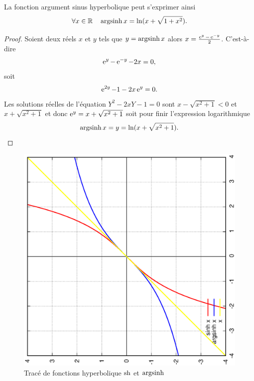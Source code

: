 %
\begin{prop}
La fonction argument sinus hyperbolique peut s'exprimer ainsi
 \begin{equation} 
   \forall x \in \mathbb{R} \quad \operatorname{argsinh} x = \ln(x+\sqrt{1+x^2}).
 \end{equation} 
\end{prop}
\begin{proof} 
  Soient deux réels $x$ et $y$ tels que $y=\operatorname{argsinh} x$ alors $x=\frac{\operatorname{e}^y - \operatorname{e}^{-y}}{2}$. C'est-à-dire 
  \begin{equation}
    \operatorname{e}^y - \operatorname{e}^{-y} -2x=0,
  \end{equation} 
  soit 
  \begin{equation}
    \operatorname{e}^{2y}-1-2x\operatorname{e}^{y}=0.
  \end{equation} 
  Les solutions réelles de l'équation $Y^2-2xY-1=0$ sont $x-\sqrt{x^2+1}<0$ et $x+\sqrt{x^2+1}$ et donc $\operatorname{e}^y=x+\sqrt{x^2+1}$ soit pour finir l'expression logarithmique 
  \begin{equation} 
    \operatorname{argsinh} x = y = \ln(x+\sqrt{x^2+1}).
  \end{equation}
\end{proof}
%
\begin{figure}
  \centering
  \includegraphics[scale=0.4,angle=-90]{argsinh.ps}
  \caption{Tracé de fonctions hyperbolique $\operatorname{sh}$ et $\operatorname{argsinh}$}
  \label{fig:tracesinhargsh}
\end{figure}
%
